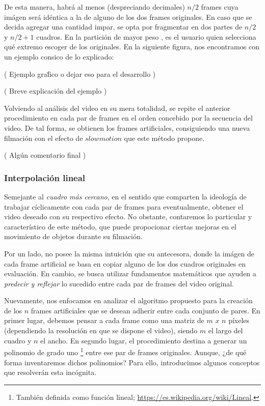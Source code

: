De esta manera, habr\'a al menos (despreciando decimales) $n/2$  frames cuya im\'agen ser\'a id\'entica a la de alguno de los dos frames originales. En caso que se decida agregar una cantidad impar, se opta por fragmentar en dos partes de $n/2$ y $n/2+1$ cuadros. En la partici\'on de mayor peso
, es el usuario quien selecciona qu\'e extremo escoger de los originales. En la siguiente figura, nos encontramos con un ejemplo consico de lo explicado: 

( Ejemplo gra\'fico o dejar eso para el desarrollo )

( Breve explicaci\'on del ejemplo )

Volviendo al an\'alisis del video en su mera totalidad, se repite el anterior procedimiento en cada par de frames en el orden concebido por la secuencia del video. De tal forma, se obtienen los frames artificiales, consiguiendo una nueva filmaci\'on con el efecto de $slowmotion$ que este m\'etodo propone. 

( Alg\'un comentario final )

\subsubsection{Interpolaci\'on lineal}

Semejante al \textit{cuadro m\'as cercano}, en el sentido que comparten la ideolog\'ia de trabajar c\'iclicamente con cada par de frames para eventualmente, obtener el video deseado con su respectivo efecto. No obstante, contaremos lo particular y caracter\'istico de este m\'etodo, que puede propocionar ciertas mejoras en el movimiento de objetos durante su filmaci\'on.

Por un lado, no posee la misma intuici\'on que su antecesora, donde la im\'agen de cada frame artificial se basa en copiar alguno de los dos cuadros originales en evaluaci\'on. En cambio, se busca utilizar fundamentos matem\'aticos que ayuden a \textit{predecir y reflejar} lo sucedido entre cada par de frames del video original. 

Nuevamente, nos enfocamos en analizar el algoritmo propuesto para la creaci\'on de los $n$ frames artificiales que se desean adherir entre cada conjunto de pares. En primer lugar, debemos pensar a cada frame como una matriz de $m$ $x$ $n$ p\'ixeles (dependiendo la resoluci\'on en que se dispone el video), siendo $m$ el largo del cuadro y $n$ el ancho. En segundo lugar, el procedimiento destina a generar un polinomio de grado uno \footnote{ Tambi\'en definida como funci\'on lineal; \url{https://es.wikipedia.org/wiki/Lineal}.} entre ese par de frames originales. Aunque, ¿de qu\'e forma inventaremos dichos polinomios? Para ello, introducimos algunos conceptos que resolver\'an esta inc\'ognita.

